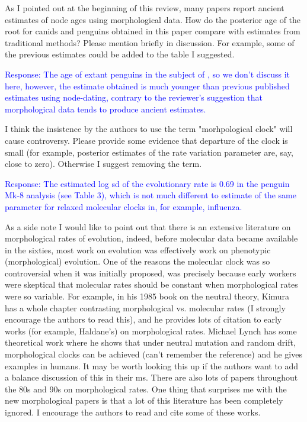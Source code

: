 \documentclass[11pt]{article}
\newcommand{\response}[1]{\medskip{}\textcolor{blue}{{Response: #1}}\medskip{}}
\begin{document}
As I pointed out at the beginning of this review, many papers report ancient estimates of node ages using morphological data. How do the posterior age of the root for canids and penguins obtained in this paper compare with estimates from traditional methods? Please mention briefly in discussion. For example, some of the previous estimates could be added to the table I suggested.

\response{The age of extant penguins in the subject of \cite{gavryushkina2015bayesian}, so we don't discuss it here, however, the estimate obtained is much younger than previous published estimates using node-dating, contrary to the reviewer's suggestion that morphological data tends to produce ancient estimates.}

I think the insistence by the authors to use the term "morhpological clock" will cause controversy. Please provide some evidence that departure of the clock is small (for example, posterior estimates of the rate variation parameter are, say, close to zero). Otherwise I suggest removing the term.

\response{The estimated log sd of the evolutionary rate is 0.69 in the penguin Mk-8 analysis (see Table 3), which is not much different to estimate of the same parameter for relaxed molecular clocks in, for example, influenza.}

As a side note I would like to point out that there is an extensive literature on morphological rates of evolution, indeed, before molecular data became available in the sixties, most work on evolution was effectively work on phenotypic (morphological) evolution. One of the reasons the molecular clock was so controversial when it was initially proposed, was precisely because early workers were skeptical that molecular rates should be constant when morphological rates were so variable. For example, in his 1985 book on the neutral theory, Kimura has a whole chapter contrasting morphological vs. molecular rates (I strongly encourage the authors to read this), and he provides lots of citation to early works (for example, Haldane's) on morphological rates. Michael Lynch has some theoretical work where he shows that under neutral mutation and random drift, morphological clocks can be achieved (can't remember the reference) and he gives examples in humans. It may be worth looking this up if the authors want to add a balance discussion of this in their ms. There are also lots of papers throughout the 80s and 90s on morphological rates. One thing that surprises me with the new morphological papers is that a lot of this literature has been completely ignored. I encourage the authors to read and cite some of these works.
\end{document}
